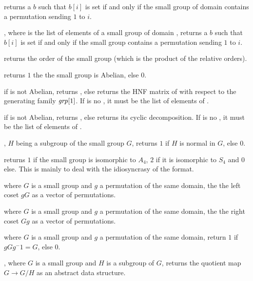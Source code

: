 returns a  $b$ such that
$b[i]$ is set if and only if the small group  of domain 
contains a permutation sending $1$ to $i$.

, where  is the list of
elements of a small group of domain , returns a  $b$ such that
$b[i]$ is set if and only if the small group contains a permutation sending $1$
to $i$.

 returns the order of the small group
 (which is the product of the relative orders).

 returns $1$ the the small group
 is Abelian, else $0$.

 if  is not Abelian,
returns , else returns the HNF matrix of  with respect to
the generating family $\hbox{\it grp\/}[1]$. If  is no , it must
be the list of elements of .

 if  is not Abelian,
returns , else returns its cyclic decomposition. If  is no
, it must be the list of elements of .

, $H$ being a subgroup of the
small group $G$, returns $1$ if $H$ is normal in $G$, else $0$.

 returns $1$ if the small group
 is isomorphic to $A_4$, $2$ if it is isomorphic to $S_4$ and
$0$ else. This is mainly to deal with the idiosyncrasy of the format.

 where $G$ is a small group and $g$ a
permutation of the same domain, the the left coset $gG$ as a vector of
permutations.

 where $G$ is a small group and $g$ a
permutation of the same domain, the the right coset $Gg$  as a vector of
permutations.

 where $G$ is a small group and
$g$ a permutation of the same domain, return $1$ if $gGg^-1=G$, else $0$.

, where $G$ is a small group and
$H$ is a subgroup of $G$, returns the quotient map $G\rightarrow G/H$
as an abstract data structure.

